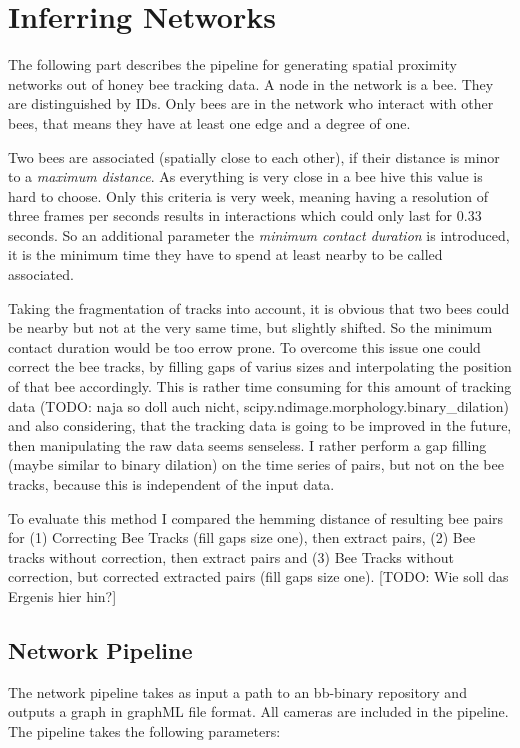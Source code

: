 \section{Inferring Networks}

The following part describes the pipeline for generating spatial proximity networks out of honey bee tracking data. A node in the network is a bee. They are distinguished by IDs. Only bees are in the network who interact with other bees, that means they have at least one edge and a degree of one.

Two bees are associated (spatially close to each other), if their distance is minor to a \emph{maximum distance}. As everything is very close in a bee hive this value is hard to choose. Only this criteria is very week, meaning having a resolution of three frames per seconds results in interactions which could only last for $0.33$ seconds. So an additional parameter the \emph{minimum contact duration} is introduced, it is the minimum time they have to spend at least nearby to be called associated.

Taking the fragmentation of tracks into account, it is obvious that two bees could be nearby but not at the very same time, but slightly shifted. So the minimum contact duration would be too errow prone. To overcome this issue one could correct the bee tracks, by filling gaps of varius sizes and interpolating the position of that bee accordingly. This is rather time consuming for this amount of tracking data (TODO: naja so doll auch nicht, scipy.ndimage.morphology.binary\_dilation) and also considering, that the tracking data is going to be improved in the future, then manipulating the raw data seems senseless. I rather perform a gap filling (maybe similar to binary dilation) on the time series of pairs, but not on the bee tracks, because this is independent of the input data.

To evaluate this method I compared the hemming distance of resulting bee pairs for (1) Correcting Bee Tracks (fill gaps size one), then extract pairs, (2) Bee tracks without correction, then extract pairs and (3) Bee Tracks without correction, but corrected extracted pairs (fill gaps size one). [TODO: Wie soll das Ergenis hier hin?]

\subsection{Network Pipeline}

The network pipeline takes as input a path to an bb-binary repository and outputs a graph in graphML file format. All cameras are included in the pipeline. The pipeline takes the following parameters:


